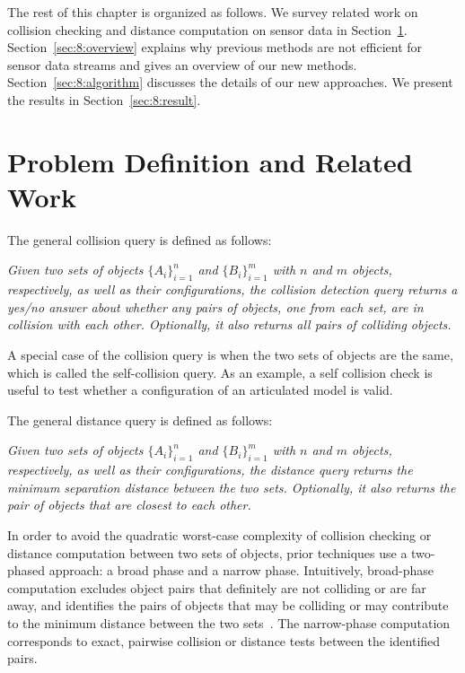 The rest of this chapter is organized as follows. We survey related work
on collision checking and distance computation on sensor data in
Section~\ref{sec:8:related}. Section~\ref{sec:8:overview} explains why
previous methods are not efficient for sensor data streams and gives an
overview of our new methods. Section~\ref{sec:8:algorithm} discusses the
details of our new approaches. We present the results in
Section~\ref{sec:8:result}.


\section{Problem Definition and Related Work}
\label{sec:8:related}

The general collision query is defined as follows:

\emph{Given two sets of objects $\{A_i\}_{i=1}^n$ and
  $\{B_i\}_{i=1}^m$ with $n$ and $m$ objects, respectively, as well as
  their configurations, the collision detection query returns a yes/no
  answer about whether any pairs of objects, one from each set, are in
  collision with each other. Optionally, it also returns all pairs
  of colliding objects.}

A special case of the collision query is when the two sets of objects
are the same, which is called the self-collision query. As an example,
a self collision check is useful to test whether a configuration of an
articulated model is valid.

The general distance query is defined as follows:

\emph{Given two sets of objects $\{A_i\}_{i=1}^n$ and
  $\{B_i\}_{i=1}^m$ with $n$ and $m$ objects, respectively, as well as
  their configurations, the distance query returns the minimum separation distance
  between the two sets. Optionally, it also returns the pair of
  objects that are closest to each other.}

In order to avoid the quadratic worst-case complexity of collision checking or distance computation between two sets of objects, prior
techniques use a two-phased approach: a broad phase and a narrow
phase. Intuitively, broad-phase computation excludes object pairs
that definitely are not colliding or are far away, and identifies
the pairs of objects that may be colliding or may contribute to the
minimum distance between the two
sets~\cite{Eric2004book,Pan:ICRA:2012}. The narrow-phase computation
corresponds to exact, pairwise collision or distance tests between the identified pairs.

